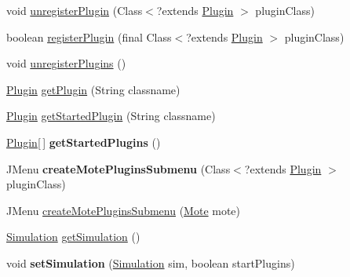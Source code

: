 \begin{DoxyCompactItemize}
\item 
void \hyperlink{classorg_1_1contikios_1_1cooja_1_1Cooja_ad46d017c3396ceb458b3fbe90056917a}{unregister\-Plugin} (Class$<$?extends \hyperlink{interfaceorg_1_1contikios_1_1cooja_1_1Plugin}{Plugin} $>$ plugin\-Class)
\item 
boolean \hyperlink{classorg_1_1contikios_1_1cooja_1_1Cooja_a1450321d34b37b5ea2f1e46806335482}{register\-Plugin} (final Class$<$?extends \hyperlink{interfaceorg_1_1contikios_1_1cooja_1_1Plugin}{Plugin} $>$ plugin\-Class)
\item 
void \hyperlink{classorg_1_1contikios_1_1cooja_1_1Cooja_acd8c2879d7778d06749d958cffb2fc06}{unregister\-Plugins} ()
\item 
\hyperlink{interfaceorg_1_1contikios_1_1cooja_1_1Plugin}{Plugin} \hyperlink{classorg_1_1contikios_1_1cooja_1_1Cooja_a3a490e5abdbecd18d31cf6272de00672}{get\-Plugin} (String classname)
\item 
\hyperlink{interfaceorg_1_1contikios_1_1cooja_1_1Plugin}{Plugin} \hyperlink{classorg_1_1contikios_1_1cooja_1_1Cooja_a53d5d25ef3b9a5c76b660f042dd461e4}{get\-Started\-Plugin} (String classname)
\item 
\hypertarget{classorg_1_1contikios_1_1cooja_1_1Cooja_a4ae72ec54e7ab614610aacb40f90ef16}{\hyperlink{interfaceorg_1_1contikios_1_1cooja_1_1Plugin}{Plugin}\mbox{[}$\,$\mbox{]} {\bfseries get\-Started\-Plugins} ()}\label{classorg_1_1contikios_1_1cooja_1_1Cooja_a4ae72ec54e7ab614610aacb40f90ef16}

\item 
\hypertarget{classorg_1_1contikios_1_1cooja_1_1Cooja_a57b652ba5793fd467ce214001a38a11c}{J\-Menu {\bfseries create\-Mote\-Plugins\-Submenu} (Class$<$?extends \hyperlink{interfaceorg_1_1contikios_1_1cooja_1_1Plugin}{Plugin} $>$ plugin\-Class)}\label{classorg_1_1contikios_1_1cooja_1_1Cooja_a57b652ba5793fd467ce214001a38a11c}

\item 
J\-Menu \hyperlink{classorg_1_1contikios_1_1cooja_1_1Cooja_a05c932e736bae89b68e5fc74fd6c6648}{create\-Mote\-Plugins\-Submenu} (\hyperlink{interfaceorg_1_1contikios_1_1cooja_1_1Mote}{Mote} mote)
\item 
\hyperlink{classorg_1_1contikios_1_1cooja_1_1Simulation}{Simulation} \hyperlink{classorg_1_1contikios_1_1cooja_1_1Cooja_a4b517e74a8b8405fd18d673079bf90bd}{get\-Simulation} ()
\item 
\hypertarget{classorg_1_1contikios_1_1cooja_1_1Cooja_a19e91b3fad20659743fcee6f8ccf5e2e}{void {\bfseries set\-Simulation} (\hyperlink{classorg_1_1contikios_1_1cooja_1_1Simulation}{Simulation} sim, boolean start\-Plugins)}\label{classorg_1_1contikios_1_1cooja_1_1Cooja_a19e91b3fad20659743fcee6f8ccf5e2e}


\end{DoxyCompactItemize}
